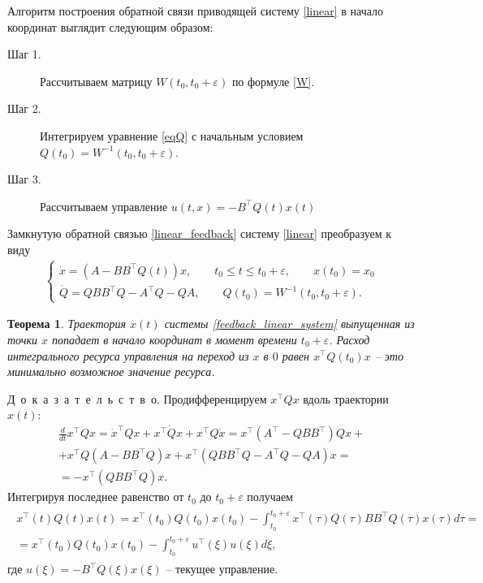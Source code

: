 \documentclass[12pt,a4paper,twoside]{article}  %
\newtheorem{teo}{Теорема}
\newcommand{\doc}{\mbox{Д о к а з а т е л ь с т в о}}
\begin{document}
		Алгоритм построения обратной связи приводящей систему \eqref{linear} в начало координат выглядит следующим образом:
		\begin{description}
			\item[Шаг 1.] Рассчитываем матрицу $ W(t_0,t_0+\varepsilon) $ по формуле \eqref{W}.
			\item[Шаг 2.] Интегрируем уравнение \eqref{eqQ} с начальным условием $ Q(t_0)  = W^{-1}(t_0,t_0+\varepsilon)$.
			\item[Шаг 3.] Рассчитываем управление $ u(t,x) = -B^{\top} Q(t) x(t)$
		\end{description}
		Замкнутую обратной связью \eqref{linear_feedback} систему \eqref{linear} преобразуем к виду
		\begin{gather}\label{feedback_linear_system}
			\left\lbrace \begin{array}{l}
				\dot{x} = (A - B B^{\top} Q(t) ) x, \qquad t_0 \leqslant t \leqslant t_0 + \varepsilon, \qquad x(t_0) = x_0\\
				\dot{Q} = Q B B^{\top} Q - A^{\top}Q - Q A, \qquad Q(t_0) = W^{-1}(t_0,t_0+\varepsilon).
			\end{array} \right. 
		\end{gather}
		\begin{teo}\label{linear_teo}
			Траектория $x(t) $ системы \eqref{feedback_linear_system} выпущенная из точки $ x $ попадает в начало координат в момент времени $ t_0 + \varepsilon$. Расход интегрального ресурса управления на переход из $ x $ в $ 0 $ равен $x^{\top} Q(t_0) x $ -- это минимально возможное значение ресурса.
		\end{teo}
		\doc. 
		Продифференцируем $x^{\top} Q x$ вдоль траектории $ x(t) $:
		\begin{gather*}
			\frac{d}{dt} x^{\top} Q x = \dot{x}^{\top} Q x + x^{\top} \dot{Q} x + x^{\top} Q \dot{x} = x^{\top} (A^{\top} - Q B B^{\top} )Q x + \\ + x^{\top} Q (A - B B^{\top} Q)x + x^{\top} (Q B B^{\top} Q - A^{\top}Q - Q A) x = \\ = 
			-x^{\top} (Q B B^{\top} Q) x.
		\end{gather*}
		Интегрируя последнее равенство от $ t_0 $ до $ t_0 + \varepsilon $ получаем
		\begin{gather}\label{xqx}
			\begin{gathered}
				x^{\top}(t) Q(t)x(t) = x^{\top}(t_0) Q(t_0)x(t_0) - \int_{t_0}^{t_0 + \varepsilon} x^{\top}(\tau) Q(\tau) B B^{\top} Q(\tau) x(\tau) d\tau= \\ = 
				x^{\top}(t_0) Q(t_0)x(t_0) - \int_{t_0}^{t_0 + \varepsilon} u^{\top}(\xi)  u(\xi) d\xi,
			\end{gathered}
		\end{gather}
		где $ u(\xi) = -B^{\top} Q(\xi) x(\xi)$ -- текущее управление.
		
\end{document}
